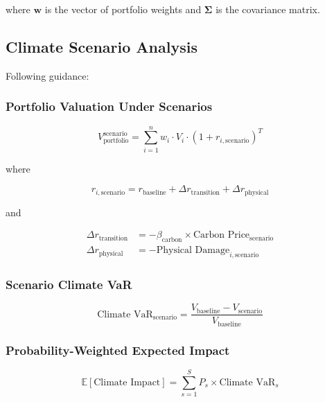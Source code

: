 \documentclass[11pt,a4paper]{article}
\begin{document}
where $\mathbf{w}$ is the vector of portfolio weights and $\boldsymbol{\Sigma}$ is the covariance matrix.

\subsection{Climate Scenario Analysis}

Following \citet{NGFS2024} guidance:

\subsubsection{Portfolio Valuation Under Scenarios}

\begin{equation}
V_{\text{portfolio}}^{\text{scenario}} = \sum_{i=1}^{n} w_i \cdot V_i \cdot (1 + r_{i,\text{scenario}})^T
\end{equation}

where

\begin{equation}
r_{i,\text{scenario}} = r_{\text{baseline}} + \Delta r_{\text{transition}} + \Delta r_{\text{physical}}
\end{equation}

and

\begin{align}
\Delta r_{\text{transition}} &= -\beta_{\text{carbon}} \times \text{Carbon Price}_{\text{scenario}}\\
\Delta r_{\text{physical}} &= -\text{Physical Damage}_{i,\text{scenario}}
\end{align}

\subsubsection{Scenario Climate VaR}

\begin{equation}
\text{Climate VaR}_{\text{scenario}} = \frac{V_{\text{baseline}} - V_{\text{scenario}}}{V_{\text{baseline}}}
\end{equation}

\subsubsection{Probability-Weighted Expected Impact}

\begin{equation}
\mathbb{E}[\text{Climate Impact}] = \sum_{s=1}^{S} P_s \times \text{Climate VaR}_s
\end{equation}
\end{document}
